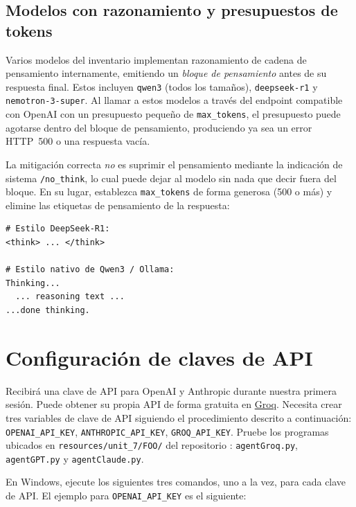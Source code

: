 \subsection{Modelos con razonamiento y presupuestos de tokens}

Varios modelos del inventario implementan razonamiento de cadena de
pensamiento internamente, emitiendo un \emph{bloque de pensamiento} antes
de su respuesta final. Estos incluyen \texttt{qwen3} (todos los tamaños),
\texttt{deepseek-r1} y \texttt{nemotron-3-super}. Al llamar a estos
modelos a través del endpoint compatible con OpenAI con un presupuesto
pequeño de \texttt{max\_tokens}, el presupuesto puede agotarse dentro del
bloque de pensamiento, produciendo ya sea un error HTTP~500 o una
respuesta vacía.

La mitigación correcta \emph{no} es suprimir el pensamiento mediante la
indicación de sistema \texttt{/no\_think}, lo cual puede dejar al modelo
sin nada que decir fuera del bloque. En su lugar, establezca
\texttt{max\_tokens} de forma generosa (500 o más) y elimine las
etiquetas de pensamiento de la respuesta:

\begin{lstlisting}[style=bashstyle, caption={Patrones de etiquetas de pensamiento a eliminar de la salida del modelo}]
# Estilo DeepSeek-R1:
<think> ... </think>

# Estilo nativo de Qwen3 / Ollama:
Thinking...
  ... reasoning text ...
...done thinking.
\end{lstlisting}

\section{Configuración de claves de API}
\label{sec:apikeys}

Recibirá una clave de API para OpenAI y Anthropic durante nuestra primera sesión. Puede obtener su propia API de forma gratuita en \href{https://groq.com}{Groq}. Necesita crear tres variables de clave de API siguiendo el procedimiento descrito a continuación: \texttt{OPENAI\_API\_KEY}, \texttt{ANTHROPIC\_API\_KEY}, \texttt{GROQ\_API\_KEY}. Pruebe los programas ubicados en \texttt{resources/unit\_7/FOO/} del repositorio \ProjectName{}: \texttt{agentGroq.py}, \texttt{agentGPT.py} y \texttt{agentClaude.py}.

\vs

En Windows, ejecute los siguientes tres comandos, uno a la vez, para cada clave de API. El ejemplo para \texttt{OPENAI\_API\_KEY} es el siguiente:

